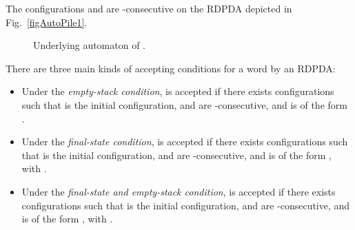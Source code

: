 The configurations  and  are -consecutive on the RDPDA
depicted in Fig.~\ref{figAutoPile1}. 

\begin{figure}[h!]
\centering
{}
\caption{Underlying automaton of .\label{figUnder}}
\end{figure}
There are three main kinds of accepting
conditions for a word  by an RDPDA:
\begin{itemize}
\item Under the {\it empty-stack
 condition},   is accepted if there exists 
configurations  such that  is the initial
configuration,  and  are -consecutive, and  is
of the form . 
\item Under the {\it final-state
 condition},  is accepted  if there exists 
configurations  such that  is the initial
configuration,  and  are -consecutive, and  is
of the form , with .
 \item Under the {\it final-state and empty-stack
 condition},  is accepted  if there exists 
configurations  such that  is the initial
configuration,  and  are -consecutive, and  is
of the form , with .
 \end{itemize}

